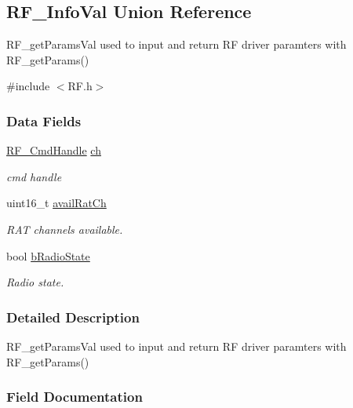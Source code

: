 \subsection{R\+F\+\_\+\+Info\+Val Union Reference}
\label{union_r_f___info_val}


R\+F\+\_\+get\+Params\+Val used to input and return R\+F driver paramters with R\+F\+\_\+get\+Params()  




{\ttfamily \#include $<$R\+F.\+h$>$}

\subsubsection*{Data Fields}
\begin{DoxyCompactItemize}
\item 
\hyperlink{_r_f_8h_acab1f56c62a9fd1ad0a91a46b6da23f1}{R\+F\+\_\+\+Cmd\+Handle} \hyperlink{union_r_f___info_val_a19bf3d8f9d5a9d3b3ec34fd6238f6564}{ch}
\begin{DoxyCompactList}\small\item\em cmd handle \end{DoxyCompactList}\item 
uint16\+\_\+t \hyperlink{union_r_f___info_val_ae380eea33c0f34396c006a85e97baa71}{avail\+Rat\+Ch}
\begin{DoxyCompactList}\small\item\em R\+A\+T channels available. \end{DoxyCompactList}\item 
bool \hyperlink{union_r_f___info_val_ae8142037b3833868a4e6b7498c4a631c}{b\+Radio\+State}
\begin{DoxyCompactList}\small\item\em Radio state. \end{DoxyCompactList}\end{DoxyCompactItemize}


\subsubsection{Detailed Description}
R\+F\+\_\+get\+Params\+Val used to input and return R\+F driver paramters with R\+F\+\_\+get\+Params() 

\subsubsection{Field Documentation}

